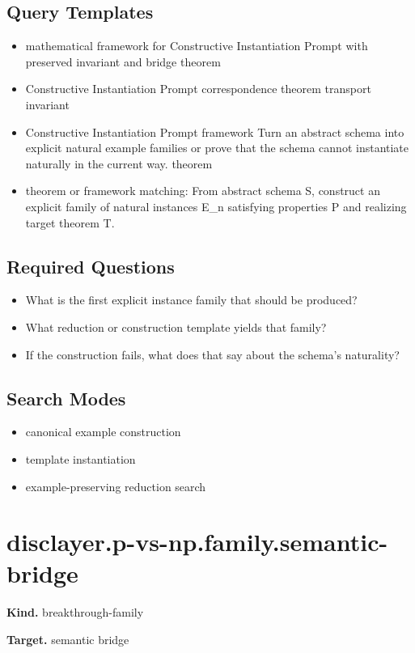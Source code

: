 \documentclass[11pt]{article}
\begin{document}
\subsection*{Query Templates}
\begin{itemize}[leftmargin=*,itemsep=0.2em]
\item mathematical framework for Constructive Instantiation Prompt with preserved invariant and bridge theorem
\item Constructive Instantiation Prompt correspondence theorem transport invariant
\item Constructive Instantiation Prompt framework Turn an abstract schema into explicit natural example families or prove that the schema cannot instantiate naturally in the current way. theorem
\item theorem or framework matching: From abstract schema S, construct an explicit family of natural instances E\_n satisfying properties P and realizing target theorem T.
\end{itemize}
\subsection*{Required Questions}
\begin{itemize}[leftmargin=*,itemsep=0.2em]
\item What is the first explicit instance family that should be produced?
\item What reduction or construction template yields that family?
\item If the construction fails, what does that say about the schema's naturality?
\end{itemize}
\subsection*{Search Modes}
\begin{itemize}[leftmargin=*,itemsep=0.2em]
\item canonical example construction
\item template instantiation
\item example-preserving reduction search
\end{itemize}
\section{disclayer.p-vs-np.family.semantic-bridge}
\textbf{Kind.} breakthrough-family

\textbf{Target.} semantic bridge
\end{document}
